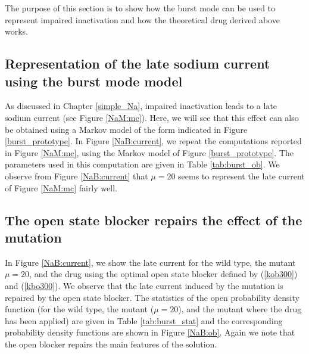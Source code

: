 
The purpose of this section is to show how the burst mode can be used to represent impaired inactivation and how the theoretical drug derived above works. 

\subsection{Representation of the late sodium current using the burst mode model}

As discussed in Chapter \ref{simple_Na}, impaired inactivation leads to a late sodium current (see Figure \ref{NaM:mc}). Here, we will see that this effect can also be obtained using a Markov model of the form indicated in Figure \ref{burst_prototype}. In Figure \ref{NaB:current}, we repeat the computations reported in Figure \ref{NaM:mc}, using the Markov model of Figure \ref{burst_prototype}. The parameters used in this computation are given in Table \ref{tab:burst_ob}. We observe from Figure \ref{NaB:current} that $\mu=20$ seems to represent the late current of Figure \ref{NaM:mc} fairly well. 
 
 \subsection{The open state blocker repairs the effect of the mutation}

In Figure \ref{NaB:current}, we show the late current for the wild type, the mutant $\mu=20$, and the drug using the optimal open state blocker defined by (\ref{kob300}) and (\ref{kbo300}). We observe that the late current induced by the mutation is  repaired by the open state blocker. The statistics of the open probability density function (for the wild type, the mutant ($\mu=20$), and the mutant where the drug has been applied) are given in Table \ref{tab:burst_stat} and  
the corresponding probability density functions are shown in Figure \ref{NaB:ob}. Again we note that the open blocker repairs the main features of the solution.



